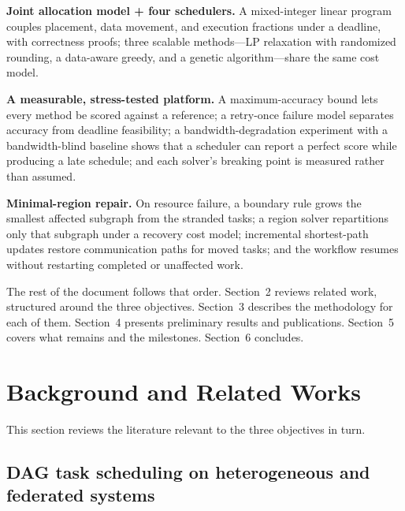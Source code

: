 \documentclass[11pt]{article}
\begin{document}
\begin{description}[leftmargin=!,labelwidth=3.4cm]
\item[Solution (a).] \textbf{Joint allocation model + four
schedulers.} A mixed-integer linear program couples placement,
data movement, and execution fractions under a deadline, with
correctness proofs; three scalable methods---LP relaxation with
randomized rounding, a data-aware greedy, and a genetic
algorithm---share the same cost model.
\item[Solution (b).] \textbf{A measurable, stress-tested
platform.} A maximum-accuracy bound lets every method be scored
against a reference; a retry-once failure model separates
accuracy from deadline feasibility; a bandwidth-degradation
experiment with a bandwidth-blind baseline shows that a scheduler
can report a perfect score while producing a late schedule; and
each solver's breaking point is measured rather than assumed.
\item[Solution (c).] \textbf{Minimal-region repair.} On
resource failure, a boundary rule grows the smallest affected
subgraph from the stranded tasks; a region solver repartitions
only that subgraph under a recovery cost model; incremental
shortest-path updates restore communication paths for moved
tasks; and the workflow resumes without restarting completed or
unaffected work.
\end{description}

The rest of the document follows that order. Section~2 reviews
related work, structured around the three objectives. Section~3
describes the methodology for each of them. Section~4 presents
preliminary results and publications. Section~5 covers what
remains and the milestones. Section~6 concludes.

\section{Background and Related Works}
\label{sec:related}

This section reviews the literature relevant to the three
objectives in turn.

\subsection{DAG task scheduling on heterogeneous and federated
systems}
\end{document}
